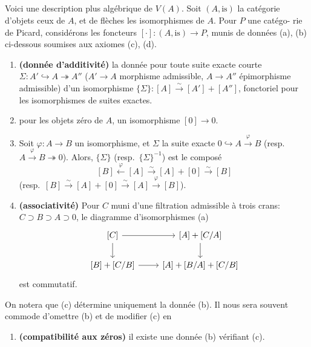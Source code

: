 \documentclass[12pt,a4paper]{article}
\theoremstyle{plain}
\theoremstyle{definition}
\begin{document}
\subsection{}

Voici une description plus alg\'ebrique de $V(A)$. Soit $(A, \text{is})$ la cat\'egorie
d'objets ceux de $A$, et de fl\`eches les isomorphismes de $A$. Pour $P$ une cat\'ego-
rie de Picard, consid\'erons les foncteurs $[\cdot]: (A, \text{is}) \to P$, munis de donn\'ees
(a), (b) ci-dessous soumises aux axiomes (c), (d).

\begin{enumerate}[label=(\alph*)]
\item \textbf{(donn\'ee d'additivit\'e)} la donn\'ee pour toute suite exacte courte $\Sigma: A' \hookrightarrow
A \twoheadrightarrow A''$ ($A' \to A$ morphisme admissible, $A \to A''$ \'epimorphisme admissible) d'un
isomorphisme $\{\Sigma\}: [A] \xrightarrow{\sim} [A'] + [A'']$, fonctoriel pour les isomorphismes de suites
exactes.

\item pour les objets z\'ero de $A$, un isomorphisme $[0] \to 0$.

\item Soit $\varphi: A \to B$ un isomorphisme, et $\Sigma$ la suite exacte $0 \hookrightarrow A \xrightarrow{\varphi} B$ (resp.\ $A \xrightarrow{\varphi} B \twoheadrightarrow 0$). Alors, $\{\Sigma\}$ (resp.\ $\{\Sigma\}^{-1}$) est le compos\'e
\[
[B] \xleftarrow{\varphi} [A] \xrightarrow{\sim} [A] + [0] \xrightarrow{\sim} [B]
\]
(resp.\ $[B] \xrightarrow{\sim} [A] + [0] \xrightarrow{\sim} [A] \xrightarrow{\varphi} [B]$).

\item \textbf{(associativit\'e)} Pour $C$ muni d'une filtration admissible \`a trois crans:
$C \supset B \supset A \supset 0$, le diagramme d'isomorphismes (a)
\[
\begin{tikzcd}
{[C]} \arrow[r] \arrow[d] & {[A] + [C/A]} \arrow[d] \\
{[B] + [C/B]} \arrow[r] & {[A] + [B/A] + [C/B]}
\end{tikzcd}
\]
est commutatif.
\end{enumerate}

On notera que (c) d\'etermine uniquement la donn\'ee (b). Il nous sera souvent
commode d'omettre (b) et de modifier (c) en

\begin{enumerate}[label=(c$'$)]
\item \textbf{(compatibilit\'e aux z\'eros)} il existe une donn\'ee (b) v\'erifiant (c).
\end{enumerate}
\end{document}
